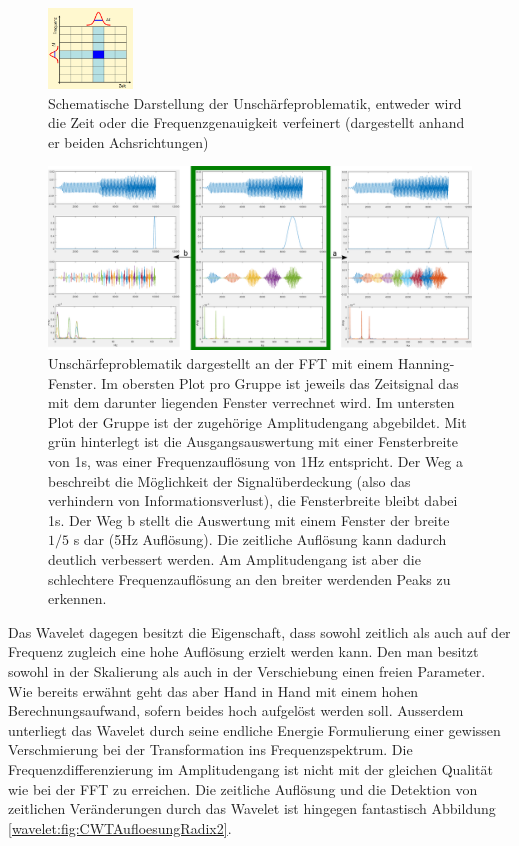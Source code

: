 \begin{figure}
	\centering
	\includegraphics[width=0.2\textwidth]{papers/wavelets/images/6-1_FFTAufloesung.png}
	\caption{Schematische Darstellung der Unschärfeproblematik, entweder wird die Zeit oder die Frequenzgenauigkeit verfeinert (dargestellt anhand er beiden Achsrichtungen)}
	\label{wavelet:fig:FFTAufloesung}
\end{figure}

\begin{figure}
	\centering
	\includegraphics[width=\textwidth]{papers/wavelets/images/6-2_AufloesungZeitVsFrequenz.png}
	\caption{Unschärfeproblematik dargestellt an der FFT mit einem Hanning-Fenster. Im obersten Plot pro Gruppe ist jeweils das Zeitsignal das mit dem darunter liegenden Fenster verrechnet wird. Im untersten Plot der Gruppe ist der zugehörige Amplitudengang abgebildet. Mit grün hinterlegt ist die Ausgangsauswertung mit einer Fensterbreite von 1s, was einer Frequenzauflösung von 1Hz entspricht. Der Weg a beschreibt die Möglichkeit der Signalüberdeckung (also das verhindern von Informationsverlust), die Fensterbreite bleibt dabei 1s. Der Weg b stellt die Auswertung mit einem Fenster der breite $1/5$ s dar (5Hz Auflösung). Die zeitliche Auflösung kann dadurch deutlich verbessert werden. Am Amplitudengang ist aber die schlechtere Frequenzauflösung an den breiter werdenden Peaks zu erkennen.}
	\label{wavelet:fig:AufloesungZeitVsFrequenz}
\end{figure}

Das Wavelet dagegen besitzt die Eigenschaft, dass sowohl zeitlich als auch auf der Frequenz zugleich eine hohe Auflösung erzielt werden kann. Den man besitzt sowohl in der Skalierung als auch in der Verschiebung einen freien Parameter. Wie bereits erwähnt geht das aber Hand in Hand mit einem hohen Berechnungsaufwand, sofern beides hoch aufgelöst werden soll. Ausserdem unterliegt das Wavelet durch seine endliche Energie Formulierung einer gewissen Verschmierung bei der Transformation ins Frequenzspektrum. Die Frequenzdifferenzierung im Amplitudengang ist nicht mit der gleichen Qualität wie bei der FFT zu erreichen. Die zeitliche Auflösung und die Detektion von zeitlichen Veränderungen durch das Wavelet ist hingegen fantastisch Abbildung \ref{wavelet:fig:CWTAufloesungRadix2}.

